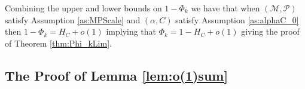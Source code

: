 \documentclass[12pt,reqno]{amsart}
\numberwithin{equation}{section}
\theoremstyle{definition}
\renewcommand{\[}{\begin{equation}}
\renewcommand{\]}{\end{equation}}
\renewcommand{\|}{\bigg{|}}
\newcommand{\maxwell}[1]{\textcolor{Goldenrod}{\;Max: #1}}
\newcommand{\mSet}{\mathcal{M}}
\newcommand{\pSet}{\mathcal{P}}
\begin{document}
Combining the upper and lower bounds on $1- \Phi_k$ we have that when $(\mSet, \pSet)$ satisfy Assumption \ref{as:MPScale} and $(\alpha, C)$ satisfy Assumption \ref{as:alphaC_0} then $1- \Phi_k = H_C + o(1)$ implying that $\Phi_k = 1 - H_C + o(1)$ giving the proof of Theorem \ref{thm:Phi_kLim}.

\subsection{The Proof of Lemma \ref{lem:o(1)sum}}

\end{document}
